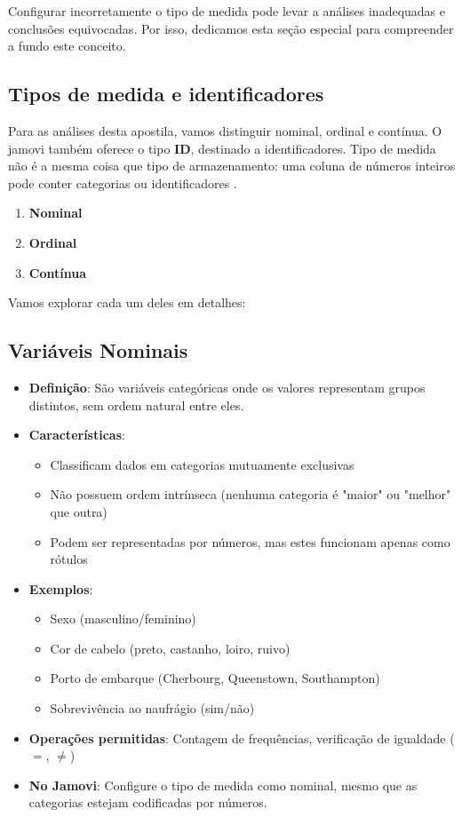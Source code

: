 Configurar incorretamente o tipo de medida pode levar a análises inadequadas e conclusões equivocadas. Por isso, dedicamos esta seção especial para compreender a fundo este conceito.

\subsection{Tipos de medida e identificadores}

Para as análises desta apostila, vamos distinguir nominal, ordinal e contínua. O jamovi também oferece o tipo \textbf{ID}, destinado a identificadores. Tipo de medida não é a mesma coisa que tipo de armazenamento: uma coluna de números inteiros pode conter categorias ou identificadores \parencite{JamoviPlanilha}.

\begin{enumerate}
    \item \textbf{Nominal}
    \item \textbf{Ordinal}
    \item \textbf{Contínua}
\end{enumerate}

Vamos explorar cada um deles em detalhes:

\subsection{Variáveis Nominais}

\begin{itemize}
    \item \textbf{Definição}: São variáveis categóricas onde os valores representam grupos distintos, sem ordem natural entre eles.
    \item \textbf{Características}: 
    \begin{itemize}
        \item Classificam dados em categorias mutuamente exclusivas
        \item Não possuem ordem intrínseca (nenhuma categoria é "maior" ou "melhor" que outra)
        \item Podem ser representadas por números, mas estes funcionam apenas como rótulos
    \end{itemize}
    \item \textbf{Exemplos}:
    \begin{itemize}
        \item Sexo (masculino/feminino)
        \item Cor de cabelo (preto, castanho, loiro, ruivo)
        \item Porto de embarque (Cherbourg, Queenstown, Southampton)
        \item Sobrevivência ao naufrágio (sim/não)
    \end{itemize}
    \item \textbf{Operações permitidas}: Contagem de frequências, verificação de igualdade ($=$, $\neq$)
    \item \textbf{No Jamovi}: Configure o tipo de medida como nominal, mesmo que as categorias estejam codificadas por números.
\end{itemize}

